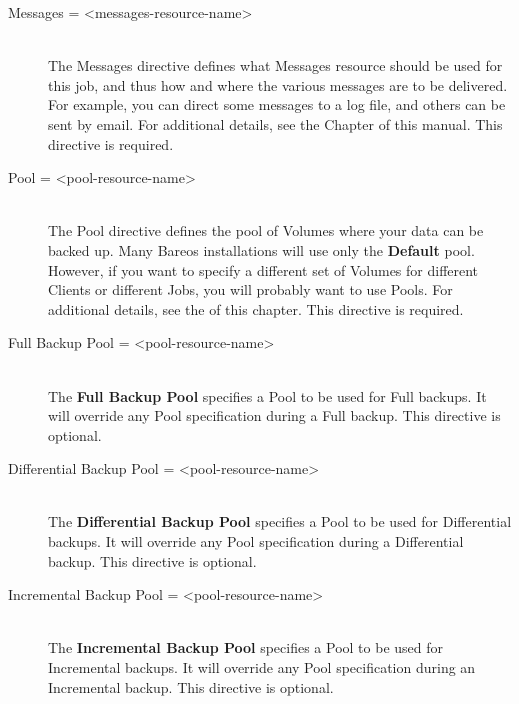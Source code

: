\begin{description}
\item [Messages = {\textless}messages-resource-name{\textgreater}] \hfill \\
The Messages directive defines what Messages resource should be used for
this job, and thus how and where the various messages are to be
delivered.  For example, you can direct some messages to a log file, and
others can be sent by email.  For additional details, see the
 Chapter of this manual.  This
directive is required.

\item [Pool = {\textless}pool-resource-name{\textgreater}] \hfill \\
The Pool directive defines the pool of Volumes where your data can be
backed up.  Many Bareos installations will use only the {\bf Default}
pool.  However, if you want to specify a different set of Volumes for
different Clients or different Jobs, you will probably want to use
Pools.  For additional details, see the  of this chapter.  This directive is required.

\item [Full Backup Pool = {\textless}pool-resource-name{\textgreater}] \hfill \\
The {\bf Full Backup Pool} specifies a Pool to be used for Full backups.
It will override any Pool specification during a Full backup.  This
directive is optional.

\item [Differential Backup Pool = {\textless}pool-resource-name{\textgreater}] \hfill \\
The {\bf Differential Backup Pool} specifies a Pool to be used for
Differential backups.  It will override any Pool specification during a
Differential backup.  This directive is optional.

\item [Incremental Backup Pool = {\textless}pool-resource-name{\textgreater}] \hfill \\
The {\bf Incremental Backup Pool} specifies a Pool to be used for
Incremental backups.  It will override any Pool specification during an
Incremental backup.  This directive is optional.


\end{description}
